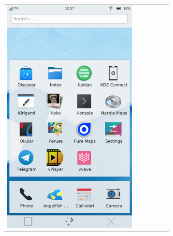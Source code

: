 \documentclass{beamer}
\begin{document}
\begin{frame}
\begin{center}
\begin{tabular}{llllll}
	\includegraphics[height=.4\textheight]{..//img/Bweb01-environnement/plasmaphone.png} \\
\end{tabular}
\end{center}

\end{frame}
\end{document}
